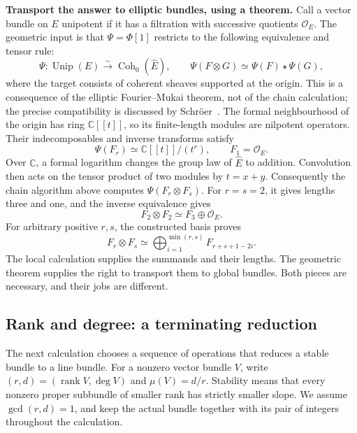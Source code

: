 \documentclass[11pt]{article}
\theoremstyle{remark}
\newcommand{\C}{\mathbb C}
\begin{document}
\textbf{Transport the answer to elliptic bundles, using a theorem.}
Call a vector bundle on \(E\) unipotent if it has a filtration with successive quotients \(\mathcal O_E\). The geometric input is that \(\Psi=\Phi[1]\) restricts to the following equivalence and tensor rule:
\begin{equation}
\Psi:\operatorname{Unip}(E)
\overset{\sim}{\longrightarrow}
\operatorname{Coh}_0(\widehat E),
\qquad
\Psi(F\otimes G)\simeq\Psi(F)\star\Psi(G),
\label{categorical:unipotent}
\end{equation}
where the target consists of coherent sheaves supported at the origin. This is a consequence of the elliptic Fourier--Mukai theorem, not of the chain calculation; the precise compatibility is discussed by Schr\"oer~\cite{schroer}. The formal neighbourhood of the origin has ring \(\C[[t]]\), so its finite-length modules are nilpotent operators. Their indecomposables and inverse transforms satisfy
\begin{equation}
\Psi(F_r)\simeq\mathbb C[[t]]/(t^r),
\qquad F_1=\mathcal O_E.
\label{categorical:fr}
\end{equation}
Over \(\C\), a formal logarithm changes the group law of \(\widehat E\) to addition. Convolution then acts on the tensor product of two modules by \(t=x+y\). Consequently the chain algorithm above computes \(\Psi(F_r\otimes F_s)\). For \(r=s=2\), it gives lengths three and one, and the inverse equivalence gives
\begin{equation}
\boxed{F_2\otimes F_2\simeq F_3\oplus\mathcal O_E.}
\label{categorical:f2-product}
\end{equation}
For arbitrary positive \(r,s\), the constructed basis proves
\begin{equation}
F_r\otimes F_s\simeq
\bigoplus_{i=1}^{\min(r,s)}F_{r+s+1-2i}.
\label{categorical:clebsch-gordan}
\end{equation}
The local calculation supplies the summands and their lengths. The geometric theorem supplies the right to transport them to global bundles. Both pieces are necessary, and their jobs are different.

\subsection{Rank and degree: a terminating reduction}
\label{categorical:euclidean-bundles}
\label{rank-degree-algorithm}

The next calculation chooses a sequence of operations that reduces a stable bundle to a line bundle. For a nonzero vector bundle \(V\), write \((r,d)=(\operatorname{rank}V,\deg V)\) and \(\mu(V)=d/r\). Stability means that every nonzero proper subbundle of smaller rank has strictly smaller slope. We assume \(\gcd(r,d)=1\), and keep the actual bundle together with its pair of integers throughout the calculation.
\end{document}
